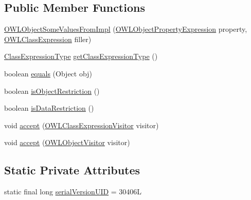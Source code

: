 \subsection*{Public Member Functions}
\begin{DoxyCompactItemize}
\item 
\hyperlink{classuk_1_1ac_1_1manchester_1_1cs_1_1owl_1_1owlapi_1_1_o_w_l_object_some_values_from_impl_ac69f89f5dfa91c0e1ee05eee9f96da8c}{O\-W\-L\-Object\-Some\-Values\-From\-Impl} (\hyperlink{interfaceorg_1_1semanticweb_1_1owlapi_1_1model_1_1_o_w_l_object_property_expression}{O\-W\-L\-Object\-Property\-Expression} property, \hyperlink{interfaceorg_1_1semanticweb_1_1owlapi_1_1model_1_1_o_w_l_class_expression}{O\-W\-L\-Class\-Expression} filler)
\item 
\hyperlink{enumorg_1_1semanticweb_1_1owlapi_1_1model_1_1_class_expression_type}{Class\-Expression\-Type} \hyperlink{classuk_1_1ac_1_1manchester_1_1cs_1_1owl_1_1owlapi_1_1_o_w_l_object_some_values_from_impl_a90dfd56bf443124c92abba3a2f4c59e2}{get\-Class\-Expression\-Type} ()
\item 
boolean \hyperlink{classuk_1_1ac_1_1manchester_1_1cs_1_1owl_1_1owlapi_1_1_o_w_l_object_some_values_from_impl_a051c5cafc4df2be3f8f10bdc36089a4e}{equals} (Object obj)
\item 
boolean \hyperlink{classuk_1_1ac_1_1manchester_1_1cs_1_1owl_1_1owlapi_1_1_o_w_l_object_some_values_from_impl_ab0ace924abae06ee2e0c74a7e3b8fc99}{is\-Object\-Restriction} ()
\item 
boolean \hyperlink{classuk_1_1ac_1_1manchester_1_1cs_1_1owl_1_1owlapi_1_1_o_w_l_object_some_values_from_impl_a802dbcaa50fdf3eb9461c14b2e943d6a}{is\-Data\-Restriction} ()
\item 
void \hyperlink{classuk_1_1ac_1_1manchester_1_1cs_1_1owl_1_1owlapi_1_1_o_w_l_object_some_values_from_impl_af7bac9997852dd6befb455f26577e00e}{accept} (\hyperlink{interfaceorg_1_1semanticweb_1_1owlapi_1_1model_1_1_o_w_l_class_expression_visitor}{O\-W\-L\-Class\-Expression\-Visitor} visitor)
\item 
void \hyperlink{classuk_1_1ac_1_1manchester_1_1cs_1_1owl_1_1owlapi_1_1_o_w_l_object_some_values_from_impl_a17732e4c37e784c8cc3ed7bc60d95ea8}{accept} (\hyperlink{interfaceorg_1_1semanticweb_1_1owlapi_1_1model_1_1_o_w_l_object_visitor}{O\-W\-L\-Object\-Visitor} visitor)
\end{DoxyCompactItemize}
\subsection*{Static Private Attributes}
\begin{DoxyCompactItemize}
\item 
static final long \hyperlink{classuk_1_1ac_1_1manchester_1_1cs_1_1owl_1_1owlapi_1_1_o_w_l_object_some_values_from_impl_a284575290e5afcd2a52fc12635dae76d}{serial\-Version\-U\-I\-D} = 30406\-L
\end{DoxyCompactItemize}
